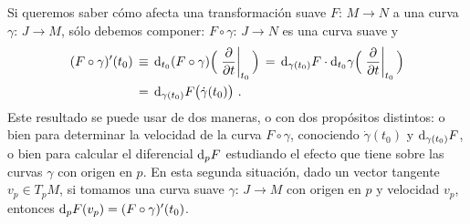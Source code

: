 Si queremos saber c\'{o}mo afecta una transformaci\'{o}n suave
$F:\,M\rightarrow N$ a una curva $\gamma:\,J\rightarrow M$, s\'{o}lo
debemos componer: $F\circ\gamma:\,J\rightarrow N$ es una curva suave y
\begin{equation}
	\label{eq:diferencialporcurvas}
	\begin{aligned}
		(F\circ\gamma)'(t_{0}) & \,\equiv\,
			\diferencial[t_{0}]{(F\circ\gamma)}
				\Big(\gancho[t_{0}]{t}\Big) \,=\,
			\diferencial[\gamma(t_{0})]{F}\cdot
			\diferencial[t_{0}]{\gamma}
				\Big(\gancho[t_{0}]{t}\Big) \\
		& \,=\,\diferencial[\gamma(t_{0})]{F}
			\big(\dot{\gamma}(t_{0})\big)
		\text{ .}
	\end{aligned}
\end{equation}
%
Este resultado se puede usar de dos maneras, o con dos prop\'{o}sitos
distintos: o bien para determinar la velocidad de la curva
$F\circ\gamma$, conociendo $\dot{\gamma}(t_{0})$ y
$\diferencial[\gamma(t_{0})]{F}$, o bien para calcular el diferencial
$\diferencial[p]{F}$ estudiando el efecto que tiene sobre las curvas
$\gamma$ con origen en $p$. En esta segunda situaci\'{o}n, dado un
vector tangente $v_{p}\in T_{p}M$, si tomamos una curva suave
$\gamma:\,J\rightarrow M$ con origen en $p$ y velocidad $v_{p}$, entonces
$\diferencial[p]{F}(v_{p})=(F\circ\gamma)'(t_{0})$.
